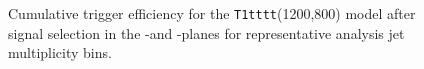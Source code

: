 \begin{figure}[h!]
  \begin{center}
     ~~
     \\
     ~~
     \\
    \caption{
Cumulative trigger efficiency for the \texttt{T1tttt}(1200,800) model after signal selection in the \alphat-\scalht and \mht-\scalht planes for representative analysis jet multiplicity bins.}
    \label{fig:T1ttt_Trigger_Efficiency}
  \end{center} 
\end{figure}







